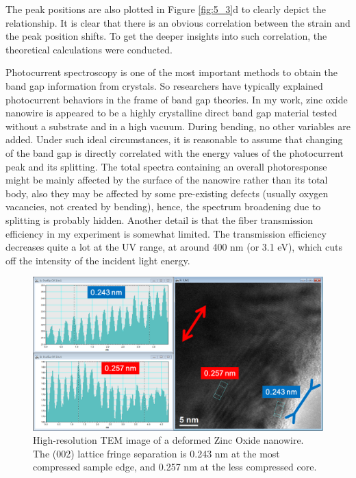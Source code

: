The peak positions are also plotted in Figure \ref{fig:5_3}d to clearly depict the relationship. 
It is clear that there is an obvious correlation between the strain and the peak position shifts. 
To get the deeper insights into such correlation, the theoretical calculations were conducted. 

Photocurrent spectroscopy is one of the most important methods to obtain the band gap information from crystals. 
So researchers have typically explained photocurrent behaviors in the frame of band gap theories. 
In my work, zinc oxide nanowire is appeared to be a highly crystalline direct band gap material tested without a substrate and in a high vacuum. During bending, no other variables are added. 
Under such ideal circumstances, it is reasonable to assume that changing of the band gap is directly correlated with the energy values of the photocurrent peak and its splitting. 
The total spectra containing an overall photoresponse might be mainly affected by the surface of the nanowire rather than its total body, also they may be affected by some pre-existing defects (usually oxygen vacancies, not created by bending), hence, the spectrum broadening due to splitting is probably hidden. 
Another detail is that the fiber transmission efficiency in my experiment is somewhat limited. 
The transmission efficiency decreases quite a lot at the UV range, at around 400 nm (or 3.1 eV), which cuts off the intensity of the incident light energy. 

\begin{figure}  
\centering
\includegraphics[width=\textwidth]{figures/figure5_s2}
\caption[Localized strain in HRTEM image]{High-resolution TEM image of a deformed Zinc Oxide nanowire. The (002) lattice fringe separation is 0.243 nm at the most compressed sample edge, and 0.257 nm at the less compressed core. 
\label{fig:5_s2}}
\end{figure}


